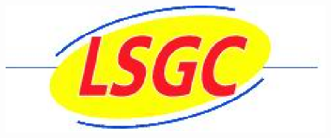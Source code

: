 \begin{minipage}[t]{1\linewidth}
\begin{minipage}[t]{0.2\linewidth}
\begin{center}
      \vspace{2cm}
      \includegraphics[width=0.9\textwidth]{pictures/logolsgc}
    \end{center}
    \vspace{10.6cm}
  \end{minipage}
\end{minipage}



